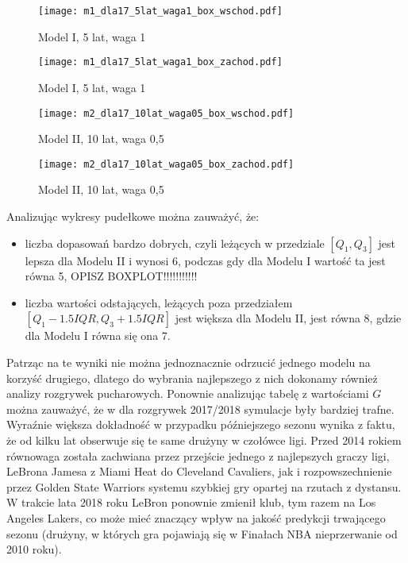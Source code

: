 \documentclass[inzynierska]{pwr_wmat_praca_dyplomowa}
\theoremstyle{plain}
\numberwithin{theorem}{chapter}
\theoremstyle{definition}
\numberwithin{theorem}{chapter}
\begin{document}
\begin{figure}[t]
	\hspace*{-3cm}  
	\texttt{[image: m1\_dla17\_5lat\_waga1\_box\_wschod.pdf]}
	\caption{Model I, 5 lat, waga 1}
	\label{m1_5lat_waga1_wschod_17}
	\centering
\end{figure}

\begin{figure}[t]
	\hspace*{-3cm}  
	\texttt{[image: m1\_dla17\_5lat\_waga1\_box\_zachod.pdf]}
	\caption{Model I, 5 lat, waga 1}
	\label{m1_5lat_waga1_zachod_17}
	\centering
\end{figure}

\begin{figure}[t]
	\hspace*{-3cm}  
	\texttt{[image: m2\_dla17\_10lat\_waga05\_box\_wschod.pdf]}
	\caption{Model II, 10 lat, waga 0,5}
	\label{m2_10lat_waga05_wschod_17}
	\centering
\end{figure}

\begin{figure}[t]
	\hspace*{-3cm}  
	\texttt{[image: m2\_dla17\_10lat\_waga05\_box\_zachod.pdf]}
	\caption{Model II, 10 lat, waga 0,5}
	\label{m2_10lat_waga05_zachod_17}
	\centering
\end{figure}
Analizując wykresy pudełkowe można zauważyć, że:
\begin{itemize}
	\item liczba dopasowań bardzo dobrych, czyli leżących w przedziale $[Q_1,Q_3]$ jest lepsza dla Modelu II i wynosi 6, podczas gdy dla Modelu I wartość ta jest równa 5,  OPISZ BOXPLOT!!!!!!!!!!!
	\item liczba wartości odstających, leżących poza przedziałem $[Q_1-1.5IQR,Q_3+1.5IQR]$ jest większa dla Modelu II, jest równa 8, gdzie dla Modelu I równa się ona 7.
\end{itemize}
Patrząc na te wyniki nie można jednoznacznie odrzucić jednego modelu na korzyść drugiego, dlatego do wybrania najlepszego z nich dokonamy również analizy rozgrywek pucharowych. Ponownie analizując tabelę z wartościami $G$ można zauważyć, że w dla rozgrywek 2017/2018 symulacje były bardziej trafne. Wyraźnie większa dokładność w przypadku późniejszego sezonu wynika z faktu, że od kilku lat obserwuje się te same drużyny w czołówce ligi. Przed 2014 rokiem równowaga została zachwiana przez przejście jednego z najlepszych graczy ligi, LeBrona Jamesa z Miami Heat do Cleveland Cavaliers, jak i rozpowszechnienie przez Golden State Warriors systemu szybkiej gry opartej na rzutach z dystansu. W trakcie lata 2018 roku LeBron ponownie zmienił klub, tym razem na Los Angeles Lakers, co może mieć znaczący wpływ na jakość predykcji trwającego sezonu (drużyny, w których gra pojawiają się w Finałach NBA nieprzerwanie od 2010 roku). 
\end{document}
